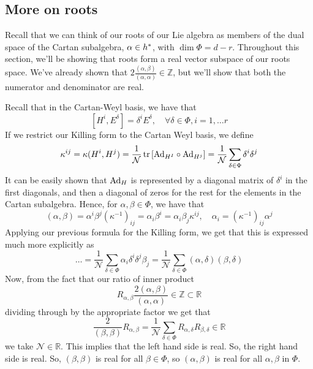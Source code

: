 \subsection{More on roots}
Recall that we can think 
of our roots of our Lie algebra as members 
of the dual space of the Cartan subalgebra, $ \alpha \in  h ^ *  $, 
with $ \dim \Phi = d - r $. 
Throughout this section, we'll 
be showing that roots form a real vector subspace of our roots space. 
We've already shown that $ 2 \frac{ ( \alpha , \beta ) }{ ( \alpha , \alpha ) } \in 
\mathbb{ Z} $, but we'll show that both the numerator and 
denominator are real. 

Recall that in the Cartan-Weyl basis, 
we have that 
\[
	\left[  H ^ i , E ^ \delta  \right]   = \delta ^ i E ^ \delta , 
	\quad \forall \delta \in \Phi , i = 1 , \dots r 
\] 
If we restrict our Killing form 
to the Cartan Weyl basis, we define 
\[
	\kappa ^{ ij }  = \kappa ( H ^ i , H ^ j ) 
	 = \frac{1}{\mathcal{ N  } } \tr \left[  
	 \text{Ad}_{ H ^ I }  \circ \text{Ad} _{ H ^ j }\right]  = \frac{1}{\mathcal{ N } } 
	 \sum_{ \delta \in \Phi } \delta ^ i \delta ^ j 
\]  It can be easily shown that $ \text{Ad}_H $ is represented by 
a diagonal matrix of $ \delta ^ i $ in the first diagonals, and then 
a diagonal of zeros for the rest for the elements 
in the Cartan subalgebra. Hence, for $ \alpha , \beta \in \Phi$, 
we have that 
 \[
 \left(  \alpha, \beta  \right)   = \alpha ^ i \beta ^ j 
 \left(  \kappa ^{ -1 }  \right)  _{ ij  } = \alpha _ i \beta ^ i  = \alpha _ i \beta _ j 
 \kappa ^{ ij} , \quad \alpha _ i = \left(  \kappa ^{ - 1}  \right) _{ ij } \alpha ^ j 
\]  Applying our previous 
formula for the Killing form, 
we get that this is expressed much more 
explicitly as 
\[
 \dots  =\frac{1}{\mathcal{ N } } \sum_{ \delta \in \Phi }
 \alpha _ i \delta ^ i \delta ^ j \beta _ j  = \frac{1}{\mathcal{ N } } 
 \sum_{ \delta \in \Phi } \left(  \alpha, \delta  \right)  \left(  
 \beta , \delta \right)  
\]  Now, from the fact that 
our ratio of inner product 
\[
	R_{ \alpha, \beta } \frac{ 2 \left(  \alpha , \beta  \right)  }{ \left(  
	\alpha, \alpha \right)  } \in \mathbb{ Z} \subset \mathbb{ R} 
\] dividing through by the appropriate factor 
we get that 
\[
	\frac{ 2 }{ \left(  \beta , \beta  \right)  } 
	R _{ \alpha , \beta }   = \frac{1}{\mathcal{ N } } 
	\sum_{ \delta \in \Phi  } R _{ \alpha, \delta } R _{ \beta , \delta } 
	\in \mathbb{ R} 
\] we take $ \mathcal{ N } \in \mathbb{ R} $. 
This implies that the left hand side is real. 
So, the right hand side is real. 
So, $ \left(  \beta , \beta  \right)  $ is real for all 
$ \beta \in \Phi  $,  so $ \left(  \alpha, \beta  \right)  $ 
is real for all $ \alpha , \beta $ in $ \Phi$. 

